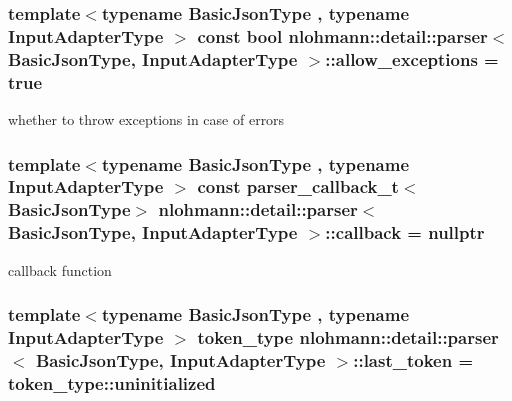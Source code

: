 \subsubsection[{\texorpdfstring{allow\+\_\+exceptions}{allow_exceptions}}]{\setlength{\rightskip}{0pt plus 5cm}template$<$typename Basic\+Json\+Type , typename Input\+Adapter\+Type $>$ const bool {\bf nlohmann\+::detail\+::parser}$<$ Basic\+Json\+Type, Input\+Adapter\+Type $>$\+::allow\+\_\+exceptions = true\hspace{0.3cm}{\ttfamily [private]}}\hypertarget{classnlohmann_1_1detail_1_1parser_ab0dbaeaa6df00631072f902068c57750}{}\label{classnlohmann_1_1detail_1_1parser_ab0dbaeaa6df00631072f902068c57750}


whether to throw exceptions in case of errors 

\subsubsection[{\texorpdfstring{callback}{callback}}]{\setlength{\rightskip}{0pt plus 5cm}template$<$typename Basic\+Json\+Type , typename Input\+Adapter\+Type $>$ const {\bf parser\+\_\+callback\+\_\+t}$<$Basic\+Json\+Type$>$ {\bf nlohmann\+::detail\+::parser}$<$ Basic\+Json\+Type, Input\+Adapter\+Type $>$\+::callback = nullptr\hspace{0.3cm}{\ttfamily [private]}}\hypertarget{classnlohmann_1_1detail_1_1parser_a6bf70a72a1632ef55c0068557b1be37a}{}\label{classnlohmann_1_1detail_1_1parser_a6bf70a72a1632ef55c0068557b1be37a}


callback function 

\subsubsection[{\texorpdfstring{last\+\_\+token}{last_token}}]{\setlength{\rightskip}{0pt plus 5cm}template$<$typename Basic\+Json\+Type , typename Input\+Adapter\+Type $>$ {\bf token\+\_\+type} {\bf nlohmann\+::detail\+::parser}$<$ Basic\+Json\+Type, Input\+Adapter\+Type $>$\+::last\+\_\+token = token\+\_\+type\+::uninitialized\hspace{0.3cm}{\ttfamily [private]}}\hypertarget{classnlohmann_1_1detail_1_1parser_a307ed42d5f31a9c5bec991ceee87b0e7}{}\label{classnlohmann_1_1detail_1_1parser_a307ed42d5f31a9c5bec991ceee87b0e7}


